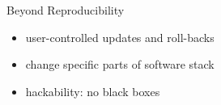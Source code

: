 \documentclass{beamer}
\begin{document}
\begin{frame}{Beyond Reproducibility}

  \Large{
    \begin{itemize}
    \item user-controlled updates and roll-backs

    \item change specific parts of software stack

    \item hackability: no black boxes
    \end{itemize}
  }
\end{frame}
\end{document}
